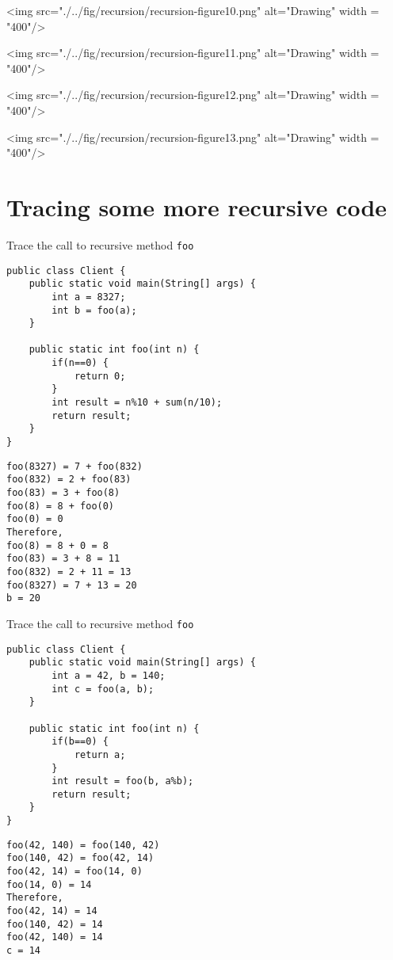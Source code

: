 \vskip0.6cm

<img src="./../fig/recursion/recursion-figure10.png" alt="Drawing" width = "400"/>

\vskip0.6cm

<img src="./../fig/recursion/recursion-figure11.png" alt="Drawing" width = "400"/>

\vskip0.6cm

<img src="./../fig/recursion/recursion-figure12.png" alt="Drawing" width = "400"/>

\vskip0.6cm

<img src="./../fig/recursion/recursion-figure13.png" alt="Drawing" width = "400"/>

\newpage
\section{Tracing some more recursive code}

\begin{exercise}[6]
Trace the call to recursive method \texttt{foo}

\begin{lstlisting}
public class Client {
	public static void main(String[] args) {
		int a = 8327;
		int b = foo(a);
	}
	
	public static int foo(int n) {
		if(n==0) {
			return 0;
		}
		int result = n%10 + sum(n/10);
		return result;
	}
}
\end{lstlisting}
\end{exercise}
\begin{answer}
\begin{verbatim}
foo(8327) = 7 + foo(832)
foo(832) = 2 + foo(83)
foo(83) = 3 + foo(8)
foo(8) = 8 + foo(0)
foo(0) = 0
Therefore,
foo(8) = 8 + 0 = 8
foo(83) = 3 + 8 = 11
foo(832) = 2 + 11 = 13
foo(8327) = 7 + 13 = 20
b = 20	
\end{verbatim}
\end{answer}

\newpage

\begin{exercise}[6]
Trace the call to recursive method \texttt{foo}

\begin{lstlisting}
public class Client {
	public static void main(String[] args) {
		int a = 42, b = 140;
		int c = foo(a, b);
	}
	
	public static int foo(int n) {
		if(b==0) {
			return a;
		}
		int result = foo(b, a%b);
		return result;
	}
}
\end{lstlisting}
\end{exercise}
\begin{answer}
\begin{verbatim}
foo(42, 140) = foo(140, 42)
foo(140, 42) = foo(42, 14)
foo(42, 14) = foo(14, 0)
foo(14, 0) = 14
Therefore,
foo(42, 14) = 14
foo(140, 42) = 14
foo(42, 140) = 14
c = 14
\end{verbatim}
\end{answer}

